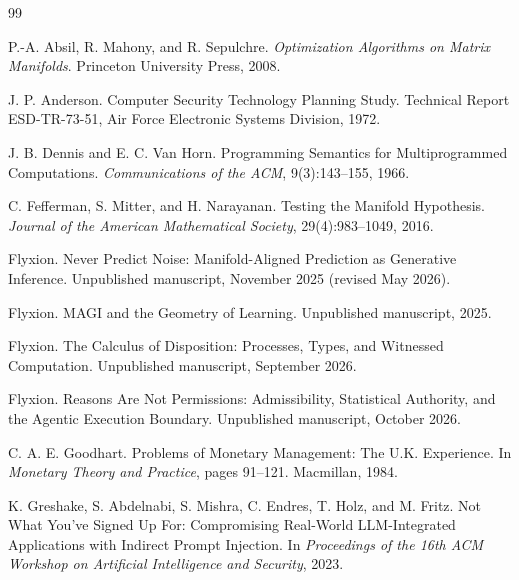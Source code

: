 \documentclass[11pt,twoside,openright]{book}
\theoremstyle{plain}
\theoremstyle{definition}
\theoremstyle{remark}
\begin{document}
\tableofcontents

\mainmatter









\appendix


\backmatter

\begin{thebibliography}{99}

P.-A. Absil, R. Mahony, and R. Sepulchre.
\newblock \emph{Optimization Algorithms on Matrix Manifolds}.
\newblock Princeton University Press, 2008.

J. P. Anderson.
\newblock Computer Security Technology Planning Study.
\newblock Technical Report ESD-TR-73-51, Air Force Electronic Systems Division, 1972.

J. B. Dennis and E. C. Van Horn.
\newblock Programming Semantics for Multiprogrammed Computations.
\newblock \emph{Communications of the ACM}, 9(3):143--155, 1966.

C. Fefferman, S. Mitter, and H. Narayanan.
\newblock Testing the Manifold Hypothesis.
\newblock \emph{Journal of the American Mathematical Society}, 29(4):983--1049, 2016.

Flyxion.
\newblock Never Predict Noise: Manifold-Aligned Prediction as Generative Inference.
\newblock Unpublished manuscript, November 2025 (revised May 2026).

Flyxion.
\newblock MAGI and the Geometry of Learning.
\newblock Unpublished manuscript, 2025.

Flyxion.
\newblock The Calculus of Disposition: Processes, Types, and Witnessed Computation.
\newblock Unpublished manuscript, September 2026.

Flyxion.
\newblock Reasons Are Not Permissions: Admissibility, Statistical Authority, and the Agentic Execution Boundary.
\newblock Unpublished manuscript, October 2026.

C. A. E. Goodhart.
\newblock Problems of Monetary Management: The U.K. Experience.
\newblock In \emph{Monetary Theory and Practice}, pages 91--121. Macmillan, 1984.

K. Greshake, S. Abdelnabi, S. Mishra, C. Endres, T. Holz, and M. Fritz.
\newblock Not What You've Signed Up For: Compromising Real-World LLM-Integrated Applications with Indirect Prompt Injection.
\newblock In \emph{Proceedings of the 16th ACM Workshop on Artificial Intelligence and Security}, 2023.


\end{thebibliography}
\end{document}
